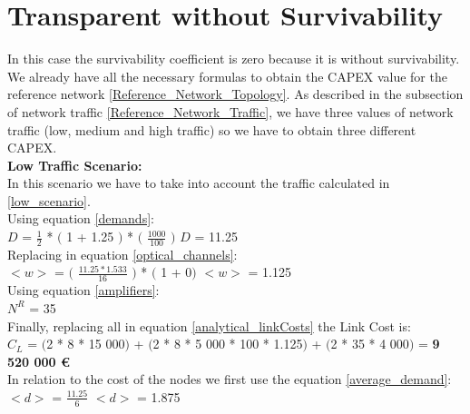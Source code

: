 \clearpage

\section{Transparent without Survivability}\label{analytical_Transp_Survivability}

In this case the survivability coefficient is zero because it is without survivability.\\
We already have all the necessary formulas to obtain the CAPEX value for the reference network \ref{Reference_Network_Topology}. As described in the subsection of network traffic \ref{Reference_Network_Traffic}, we have three values of network traffic (low, medium and high traffic) so we have to obtain three different CAPEX.\\

\textbf{Low Traffic Scenario:}\\

In this scenario we have to take into account the traffic calculated in \ref{low_scenario}.\\

Using equation \ref{demands}:\\

$D$ = $\frac{1}{2}$ * $($ 1 + 1.25 $)$ * $($ $\frac{1000}{100}$ $)$ \qquad \qquad $D$ = 11.25\\

Replacing in equation \ref{optical_channels}:\\

$<w>$ = $($ $\frac{11.25 * 1.533}{16}$ $)$ * $($ 1 + 0$)$ \qquad \qquad $<w>$ = 1.125\\

Using equation \ref{amplifiers}:\\

$N^R$ = 35\\

Finally, replacing all in equation \ref{analytical_linkCosts} the Link Cost is:\\

$C_L$ = $($2 * 8 * 15 000$)$ + $($2 * 8 * 5 000 * 100 * 1.125$)$ + $($2 * 35 * 4 000$)$ = \textbf{9 520 000 \euro}\\

In relation to the cost of the nodes we first use the equation \ref{average_demand}:\\

$<d>$ = $\frac{11.25}{6}$ \qquad \qquad $<d>$ = 1.875\\

